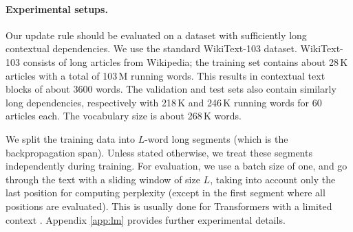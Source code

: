 \documentclass{article}
\theoremstyle{definition}
\begin{document}
\paragraph{Experimental setups.}
Our update rule should be evaluated on
a dataset with sufficiently long contextual dependencies.
We use the standard WikiText-103 \citep{merity2016pointer} dataset.
WikiText-103 consists of long articles from Wikipedia;
the training set contains about 28\,K articles with a total of 103\,M running words.
This results in contextual text blocks of about 3600 words.
The validation and test sets also contain similarly long dependencies,
respectively with 218\,K and 246\,K running words for 60 articles each.
The vocabulary size is about 268\,K words.

We split the training data into $L$-word long segments
(which is the backpropagation span).
Unless stated otherwise, we treat these segments independently 
during training.
For evaluation, we use a batch size of one, 
and go through the text with a sliding window of size $L$, taking
into account only the last position for computing perplexity (except
in the first segment where all positions are evaluated). This
is usually done for Transformers with a limited context \cite{al2018character}.
Appendix \ref{app:lm} provides further experimental details.
\end{document}
